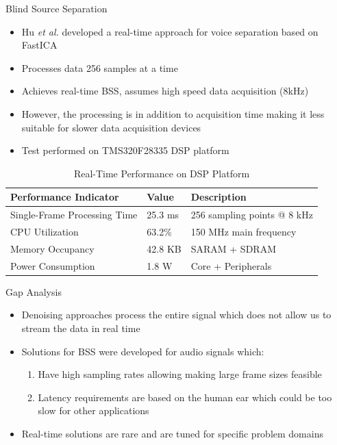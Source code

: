 \documentclass{beamer}
\begin{document}
\begin{frame}{Blind Source Separation}
    \begin{itemize}
        \item Hu \textit{et al.} developed a real-time approach for voice separation based on FastICA \cite{Hu2025FactoryBS}
        \item Processes data 256 samples at a time
        \item Achieves real-time BSS, assumes high speed data acquisition (8kHz)
        \item However, the processing is in addition to acquisition time making it less suitable for slower data acquisition devices
        \item Test performed on TMS320F28335 DSP platform
    \end{itemize}
    \begin{table}[htbp]
        \centering
        \caption{Real-Time Performance on DSP Platform \cite{Hu2025FactoryBS}}
        \label{tab:dsp_performance}
        \begin{tabular}{|l|l|l|}
            \hline
            \textbf{Performance Indicator} & \textbf{Value} & \textbf{Description} \\ \hline
            Single-Frame Processing Time & 25.3 ms & 256 sampling points @ 8 kHz \\ \hline
            CPU Utilization & 63.2\% & 150 MHz main frequency \\ \hline
            Memory Occupancy & 42.8 KB & SARAM + SDRAM \\ \hline
            Power Consumption & 1.8 W & Core + Peripherals \\ \hline
        \end{tabular}
    \end{table}
\end{frame}

\begin{frame}{Gap Analysis}
    \begin{itemize}
        \item Denoising approaches process the entire signal which does not allow us to stream the data in real time
        \item Solutions for BSS were developed for audio signals which:
        \begin{enumerate}
            \item Have high sampling rates allowing making large frame sizes feasible
            \item Latency requirements are based on the human ear which could be too slow for other applications
        \end{enumerate}
        \item Real-time solutions are rare and are tuned for specific problem domains
    \end{itemize}
\end{frame}
\end{document}
